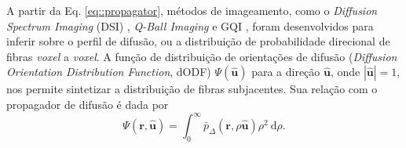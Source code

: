 \documentclass[
    12pt,                %
    oneside,            %
    a4paper,            %
    english,            %
    french,                %
    spanish,            %
    brazil                %
    ]{abntex2}
\begin{document}
A partir da Eq. \ref{eq::propagator}, métodos de imageamento, como o \textit{Diffusion Spectrum Imaging} (DSI) \cite{tuch2002, wedeen2005}, \textit{Q-Ball Imaging} \cite{TuchQBall2004} e GQI \cite{yeh2010}, foram desenvolvidos para inferir sobre o perfil de difusão, ou a distribuição de probabilidade direcional de fibras \textit{voxel} a \textit{voxel}. 
A função de distribuição de orientações de difusão (\textit{Diffusion Orientation Distribution Function}, dODF) $\Psi(\mathbf{\hat{u}})$ para a direção $\mathbf{\hat{u}}$, onde $|\mathbf{\hat{u}}| = 1$,  nos permite sintetizar a distribuição de fibras subjacentes. Sua relação com o propagador de difusão é dada por \cite{tuch2002}
\begin{equation}
\label{eq::dodf_propagador}
\Psi(\mathbf{\mathbf{r},\hat{u}})=\int_{0}^{\infty} \bar{p}_{\Delta}(\mathbf{r}, \rho  \mathbf{\hat{u}}) \rho^2 \mathrm{~d}\rho .
\end{equation}






\end{document}
